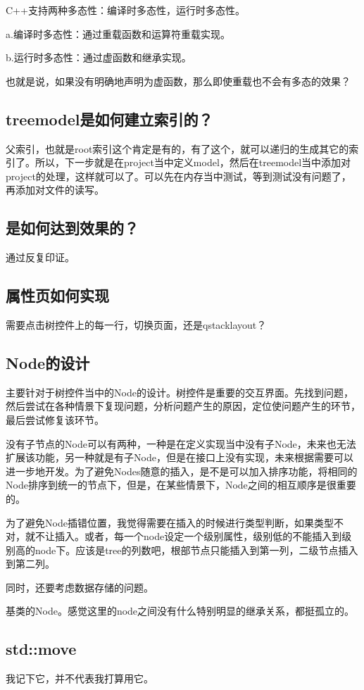 C++支持两种多态性：编译时多态性，运行时多态性。 

a.编译时多态性：通过重载函数和运算符重载实现。 

b.运行时多态性：通过虚函数和继承实现。

也就是说，如果没有明确地声明为虚函数，那么即使重载也不会有多态的效果？
\subsection{treemodel是如何建立索引的？}
父索引，也就是root索引这个肯定是有的，有了这个，就可以递归的生成其它的索引了。所以，下一步就是在project当中定义model，然后在treemodel当中添加对project的处理，这样就可以了。可以先在内存当中测试，等到测试没有问题了，再添加对文件的读写。

\subsection{是如何达到效果的？}
通过反复印证。
\subsection{属性页如何实现}
需要点击树控件上的每一行，切换页面，还是qstacklayout？
\subsection{Node的设计}
主要针对于树控件当中的Node的设计。树控件是重要的交互界面。先找到问题，然后尝试在各种情景下复现问题，分析问题产生的原因，定位使问题产生的环节，最后尝试修复该环节。

没有子节点的Node可以有两种，一种是在定义实现当中没有子Node，未来也无法扩展该功能，另一种就是有子Node，但是在接口上没有实现，未来根据需要可以进一步地开发。为了避免Nodes随意的插入，是不是可以加入排序功能，将相同的Node排序到统一的节点下，但是，在某些情景下，Node之间的相互顺序是很重要的。

为了避免Node插错位置，我觉得需要在插入的时候进行类型判断，如果类型不对，就不让插入。或者，每一个node设定一个级别属性，级别低的不能插入到级别高的node下。应该是tree的列数吧，根部节点只能插入到第一列，二级节点插入到第二列。

同时，还要考虑数据存储的问题。

基类的Node。感觉这里的node之间没有什么特别明显的继承关系，都挺孤立的。
\subsection{std::move}
我记下它，并不代表我打算用它。

